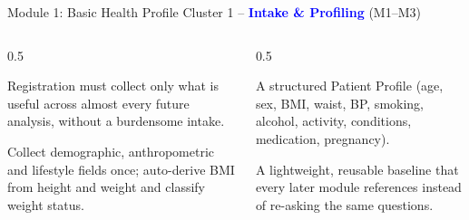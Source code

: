 \documentclass[9pt,aspectratio=169]{beamer}
\begin{document}
\begin{frame}{Module 1: Basic Health Profile}
\textcolor{black!55}{\scriptsize Cluster 1 -- \textcolor{blue}{\textbf{Intake \& Profiling}} (M1--M3)}\\[2pt]
\begin{columns}[T,onlytextwidth]
\begin{column}{0.5\textwidth}
\begin{tcolorbox}[colback=blue!7,colframe=blue!55!black,title=\textbf{Motivation},boxrule=0.6pt,arc=1mm,left=5pt,right=5pt,top=3pt,bottom=3pt,fonttitle=\small]
\footnotesize Registration must collect only what is useful across almost every future analysis, without a burdensome intake.
\end{tcolorbox}
\vspace{5pt}
\begin{tcolorbox}[colback=teal!7,colframe=teal!55!black,title=\textbf{Method},boxrule=0.6pt,arc=1mm,left=5pt,right=5pt,top=3pt,bottom=3pt,fonttitle=\small]
\footnotesize Collect demographic, anthropometric and lifestyle fields once; auto-derive BMI from height and weight and classify weight status.
\end{tcolorbox}
\end{column}
\begin{column}{0.5\textwidth}
\begin{tcolorbox}[colback=green!8,colframe=green!45!black,title=\textbf{Result},boxrule=0.6pt,arc=1mm,left=5pt,right=5pt,top=3pt,bottom=3pt,fonttitle=\small]
\footnotesize A structured Patient Profile (age, sex, BMI, waist, BP, smoking, alcohol, activity, conditions, medication, pregnancy).
\end{tcolorbox}
\vspace{5pt}
\begin{tcolorbox}[colback=orange!10,colframe=orange!65!black,title=\textbf{Conclusion},boxrule=0.6pt,arc=1mm,left=5pt,right=5pt,top=3pt,bottom=3pt,fonttitle=\small]
\footnotesize A lightweight, reusable baseline that every later module references instead of re-asking the same questions.
\end{tcolorbox}
\end{column}
\end{columns}
\end{frame}
\end{document}
